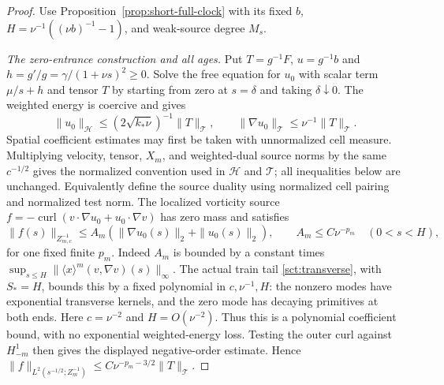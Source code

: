 \begin{proof}
Use Proposition~\ref{prop:short-full-clock} with its fixed $b$,
$H=\nu^{-1}((\nu b)^{-1}-1)$, and weak-source degree $M_s$.

\emph{The zero-entrance construction and all ages.}
Put $T=g^{-1}F$, $u=g^{-1}b$ and
$h=g'/g=\gamma/(1+\nu s)^2\ge0$. Solve the free equation for $u_0$
with scalar term $\mu/s+h$ and tensor $T$ by starting from zero at
$s=\delta$ and taking $\delta\downarrow0$. The weighted energy is
coercive and gives
\[
 \|u_0\|_{\mathcal H}\le(2\sqrt{k_*\nu})^{-1}\|T\|_{\mathcal T},
 \qquad \|\nabla u_0\|_{\mathcal T}\le\nu^{-1}\|T\|_{\mathcal T}.
\]
Spatial coefficient estimates may first be taken with unnormalized
cell measure. Multiplying velocity, tensor, $X_m$, and weighted-dual
source norms by the same $c^{-1/2}$ gives the normalized convention
used in $\mathcal H$ and $\mathcal T$; all inequalities below are
unchanged. Equivalently define the source duality using normalized
cell pairing and normalized test norm.
The localized vorticity source
$f=-\operatorname{curl}(v\cdot\nabla u_0+u_0\cdot\nabla v)$
has zero mass and satisfies
\[
 \|f(s)\|_{Z^{-1}_{m,c}}
 \le A_m(\|\nabla u_0(s)\|_2+\|u_0(s)\|_2),\qquad
 A_m\le C\nu^{-p_m}\quad(0<s<H),
\]
for one fixed finite $p_m$. Indeed $A_m$ is bounded by a constant
times $\sup_{s\le H}\|\langle x\rangle^m(v,\nabla v)(s)\|_\infty$.
The actual train tail \eqref{sct:transverse}, with $S_*=H$, bounds
this by a fixed polynomial in $c,\nu^{-1},H$: the nonzero modes
have exponential transverse kernels, and the zero mode has decaying
primitives at both ends. Here $c=\nu^{-2}$ and $H=O(\nu^{-2})$.
Thus this is a polynomial coefficient bound, with no exponential
weighted-energy loss. Testing the outer curl against $H^1_{-m}$
then gives the displayed negative-order estimate. Hence
$\|f\|_{L^2(s^{-1/2};Z^{-1}_m)}
\le C\nu^{-p_m-3/2}\|T\|_{\mathcal T}$.


\end{proof}
